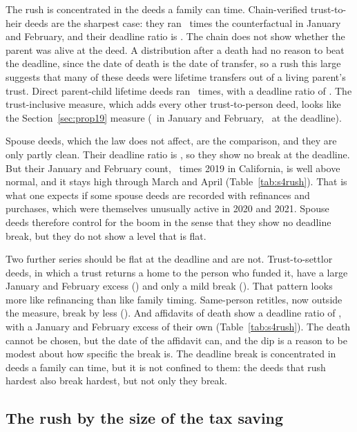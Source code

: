 The rush is concentrated in the deeds a family can time. Chain-verified trust-to-heir deeds are the sharpest case: they ran \SIVHeirJanFeb\ times the counterfactual in January and February, and their deadline ratio is \SIVHeirDeadlineSign. The chain does not show whether the parent was alive at the deed. A distribution after a death had no reason to beat the deadline, since the date of death is the date of transfer, so a rush this large suggests that many of these deeds were lifetime transfers out of a living parent's trust. Direct parent-child lifetime deeds ran \SIVPcJanFeb\ times, with a deadline ratio of \SIVPcDeadlineSign. The trust-inclusive measure, which adds every other trust-to-person deed, looks like the Section~\ref{sec:prop19} measure (\SIVUpperJanFeb\ in January and February, \SIVUpperDeadlineSign\ at the deadline).

Spouse deeds, which the law does not affect, are the comparison, and they are only partly clean. Their deadline ratio is \SIVSpouseDeadlineSign, so they show no break at the deadline. But their January and February count, \SIVSpouseJanFeb\ times 2019 in California, is well above normal, and it stays high through March and April (Table~\ref{tab:s4rush}). That is what one expects if some spouse deeds are recorded with refinances and purchases, which were themselves unusually active in 2020 and 2021. Spouse deeds therefore control for the boom in the sense that they show no deadline break, but they do not show a level that is flat.

Two further series should be flat at the deadline and are not. Trust-to-settlor deeds, in which a trust returns a home to the person who funded it, have a large January and February excess (\SIVSettlorJanFeb) and only a mild break (\SIVSettlorDeadlineSign). That pattern looks more like refinancing than like family timing. Same-person retitles, now outside the measure, break by less (\SIVRetitleDeadlineSign). And affidavits of death show a deadline ratio of \SIVAffidavitDeadlineSign, with a January and February excess of their own (Table~\ref{tab:s4rush}). The death cannot be chosen, but the date of the affidavit can, and the dip is a reason to be modest about how specific the break is. The deadline break is concentrated in deeds a family can time, but it is not confined to them: the deeds that rush hardest also break hardest, but not only they break.

\subsection{The rush by the size of the tax saving}\label{subsec:gradient}


